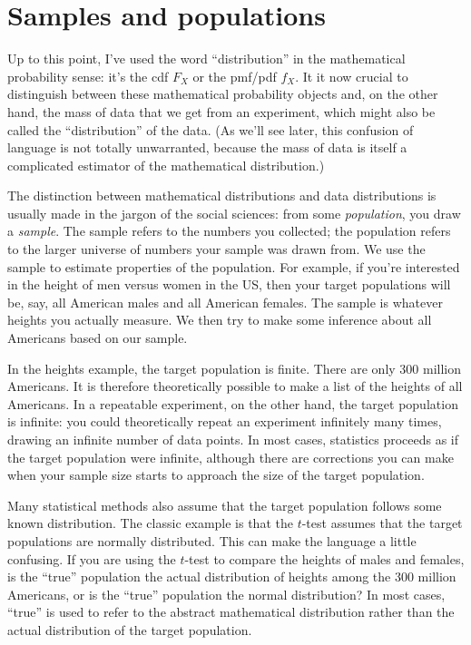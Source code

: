 \section{Samples and populations}

Up to this point, I've used the word ``distribution'' in the mathematical
probability sense: it's the cdf $F_X$ or the pmf/pdf $f_X$.
It it now crucial to distinguish between these mathematical
probability objects and, on the other hand, the mass of data
that we get from an experiment, which might also be called the ``distribution''
of the data. (As we'll see later, this confusion of language is not
totally unwarranted, because the mass of data is itself a complicated estimator
of the mathematical distribution.)

The distinction between mathematical distributions and data distributions is
usually made in the jargon of the social sciences: from some
\emph{population}, you draw a \emph{sample}. The sample refers to the numbers
you collected; the population refers to the larger universe of numbers your
sample was drawn from. We use the sample to estimate properties of the
population. For example, if you're interested in the height of men versus
women in the US, then your target populations will be, say, all American males
and all American females. The sample is whatever heights you actually measure.
We then try to make some inference about all Americans based on our sample.

In the heights example, the target population is finite. There are only 300
million Americans. It is therefore theoretically possible to make a list of
the heights of all Americans. In a repeatable experiment, on the other hand,
the target population is infinite: you could theoretically repeat an
experiment infinitely many times, drawing an infinite number of data points.
In most cases, statistics proceeds as if the target population were infinite,
although there are corrections you can make when your sample size starts to
approach the size of the target population.

Many statistical methods also assume that the target population follows some
known distribution. The classic example is that the $t$-test assumes that the
target populations are normally distributed. This can make the language a
little confusing. If you are using the $t$-test to compare the heights of
males and females, is the ``true'' population the actual distribution of
heights among the 300 million Americans, or is the ``true'' population the
normal distribution? In most cases, ``true'' is used to refer to the abstract
mathematical distribution rather than the actual distribution of the target
population.

